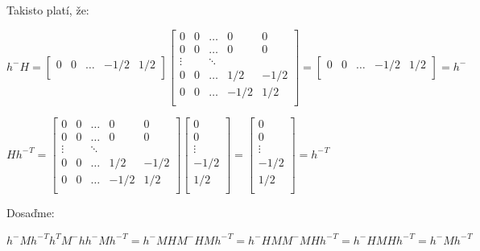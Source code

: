 \begin{dokaz}
Takisto platí, že:

\begin{center}
$
h^- H =
\begin{bmatrix}
0 & 0 & \ldots & -1/2 & 1/2 \\
\end{bmatrix}
\begin{bmatrix}
0 & 0 & \ldots & 0 & 0 \\
0 & 0 & \ldots & 0 & 0 \\
\vdots && \ddots \\
0 & 0 & \ldots & 1/2 & -1/2 \\
0 & 0 & \ldots & -1/2 & 1/2 \\
\end{bmatrix}
=
\begin{bmatrix}
0 & 0 & \ldots & -1/2 & 1/2 \\
\end{bmatrix}
= h^-
$
\end{center}

\begin{center}
$
H {h^-}^T =
\begin{bmatrix}
0 & 0 & \ldots & 0 & 0 \\
0 & 0 & \ldots & 0 & 0 \\
\vdots && \ddots \\
0 & 0 & \ldots & 1/2 & -1/2 \\
0 & 0 & \ldots & -1/2 & 1/2 \\
\end{bmatrix}
\begin{bmatrix}
0 \\
0 \\
\vdots \\
-1/2 \\
1/2 \\
\end{bmatrix}
=
\begin{bmatrix}
0 \\
0 \\
\vdots \\
-1/2 \\
1/2 \\
\end{bmatrix}
= {h^-}^T
$
\end{center}

Dosaďme:

\begin{center}
$
h^- M {h^-}^T h^T M^- h h^- M {h^-}^T = h^- M H M^- H M {h^-}^T = h^- H M M^- M H {h^-}^T = h^- H M H {h^-}^T = h^- M {h^-}^T
$
\end{center}


\end{dokaz}
